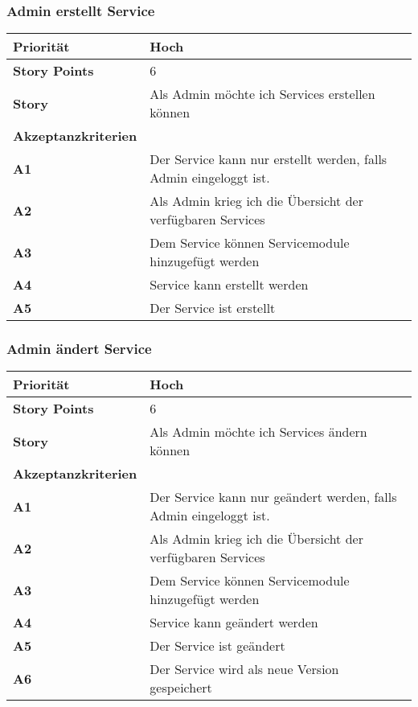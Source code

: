  \subsubsection{Admin erstellt Service}
 \begin{tabularx}{\linewidth}{l X}
  \textbf{Priorität} & Hoch\\
  \hline
  \textbf{Story Points} & 6\\
  \hline
  \textbf{Story}& Als Admin möchte ich Services erstellen können\\
  \hline
    \textbf{Akzeptanzkriterien} & \\
    \hline
      \textbf{A1} & Der Service kann nur erstellt werden, falls Admin eingeloggt ist.\\
  \hline
  \textbf{A2} & Als Admin krieg ich die Übersicht der verfügbaren Services\\
  \hline
    \textbf{A3} & Dem Service können Servicemodule hinzugefügt werden\\
  \hline
  \textbf{A4} & Service kann erstellt werden\\
  \hline
    \textbf{A5} & Der Service ist erstellt\\
  \hline
 \end{tabularx}
 
 \subsubsection{Admin ändert Service}
 \begin{tabularx}{\linewidth}{l X}
  \textbf{Priorität} & Hoch\\
  \hline
  \textbf{Story Points} & 6\\
  \hline
  \textbf{Story}& Als Admin möchte ich Services ändern können\\
  \hline
    \textbf{Akzeptanzkriterien} & \\
    \hline
      \textbf{A1} & Der Service kann nur geändert werden, falls Admin eingeloggt ist.\\
  \hline
  \textbf{A2} & Als Admin krieg ich die Übersicht der verfügbaren Services\\
  \hline
    \textbf{A3} & Dem Service können Servicemodule hinzugefügt werden\\
  \hline
  \textbf{A4} & Service kann geändert werden\\
  \hline
    \textbf{A5} & Der Service ist geändert\\
  \hline
  \textbf{A6} & Der Service wird als neue Version gespeichert\\
  \hline
 \end{tabularx}

